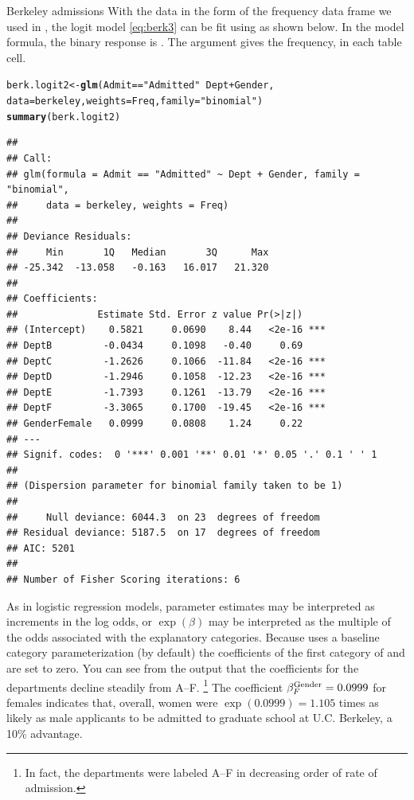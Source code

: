 \documentclass[11pt]{book}\usepackage[]{graphicx}\usepackage[]{color}
\makeatletter
\newcommand{\hlstr}[1]{\textcolor[rgb]{0.192,0.494,0.8}{#1}}%
\newcommand{\hlopt}[1]{\textcolor[rgb]{0,0,0}{#1}}%
\newcommand{\hlstd}[1]{\textcolor[rgb]{0.345,0.345,0.345}{#1}}%
\newcommand{\hlkwb}[1]{\textcolor[rgb]{0.69,0.353,0.396}{#1}}%
\newcommand{\hlkwc}[1]{\textcolor[rgb]{0.333,0.667,0.333}{#1}}%
\newcommand{\hlkwd}[1]{\textcolor[rgb]{0.737,0.353,0.396}{\textbf{#1}}}%
\newenvironment{kframe}{%
 \def\at@end@of@kframe{}%
 \ifinner\ifhmode%
  \def\at@end@of@kframe{\end{minipage}}%
  \begin{minipage}{\columnwidth}%
 \fi\fi%
 \def\FrameCommand##1{\hskip\@totalleftmargin \hskip-\fboxsep
 \colorbox{shadecolor}{##1}\hskip-\fboxsep
     \hskip-\linewidth \hskip-\@totalleftmargin \hskip\columnwidth}%
 \MakeFramed {\advance\hsize-\width
   \@totalleftmargin\z@ \linewidth\hsize
   \@setminipage}}%
 {\par\unskip\endMakeFramed%
 \at@end@of@kframe}
\newenvironment{knitrout}{}{} %
\renewenvironment{knitrout}{\small\renewcommand{\baselinestretch}{.85}}{} %
\makeatother
\begin{document}
\begin{Example}[berkeley7]{Berkeley admissions}
With the data in the form of the frequency data frame 
we used in , the logit model \eqref{eq:berk3}
can be fit using  as shown below.  In the model formula,
the binary response is . The 
argument gives the frequency,  in each table cell.

\begin{knitrout}
\color{fgcolor}\begin{kframe}
\begin{alltt}
\hlstd{berk.logit2} \hlkwb{<-} \hlkwd{glm}\hlstd{(Admit}\hlopt{==}\hlstr{"Admitted"} \hlopt{~} \hlstd{Dept} \hlopt{+} \hlstd{Gender,}
                   \hlkwc{data}\hlstd{=berkeley,} \hlkwc{weights}\hlstd{=Freq,} \hlkwc{family}\hlstd{=}\hlstr{"binomial"}\hlstd{)}
\hlkwd{summary}\hlstd{(berk.logit2)}
\end{alltt}
\begin{verbatim}
## 
## Call:
## glm(formula = Admit == "Admitted" ~ Dept + Gender, family = "binomial", 
##     data = berkeley, weights = Freq)
## 
## Deviance Residuals: 
##     Min       1Q   Median       3Q      Max  
## -25.342  -13.058   -0.163   16.017   21.320  
## 
## Coefficients:
##              Estimate Std. Error z value Pr(>|z|)    
## (Intercept)    0.5821     0.0690    8.44   <2e-16 ***
## DeptB         -0.0434     0.1098   -0.40     0.69    
## DeptC         -1.2626     0.1066  -11.84   <2e-16 ***
## DeptD         -1.2946     0.1058  -12.23   <2e-16 ***
## DeptE         -1.7393     0.1261  -13.79   <2e-16 ***
## DeptF         -3.3065     0.1700  -19.45   <2e-16 ***
## GenderFemale   0.0999     0.0808    1.24     0.22    
## ---
## Signif. codes:  0 '***' 0.001 '**' 0.01 '*' 0.05 '.' 0.1 ' ' 1
## 
## (Dispersion parameter for binomial family taken to be 1)
## 
##     Null deviance: 6044.3  on 23  degrees of freedom
## Residual deviance: 5187.5  on 17  degrees of freedom
## AIC: 5201
## 
## Number of Fisher Scoring iterations: 6
\end{verbatim}
\end{kframe}
\end{knitrout}

As in logistic regression models, parameter estimates may be interpreted
as increments in the log odds, or $\exp(\beta)$ may be interpreted
as the multiple of the odds associated with the explanatory categories.
Because  uses a baseline category parameterization (by default)
the coefficients of the first category of  and
 are set to zero.
You can see from the  output
that the coefficients for the departments decline steadily
from A--F.%
\footnote{
In fact, the departments were labeled A--F in decreasing order of
rate of admission.
}
The coefficient $\beta _F^{\mbox{\scriptsize Gender}} = 0.0999$
for females indicates that, overall, women were $\exp({0.0999}) = 1.105$
times as likely as male applicants to be admitted to graduate school
at U.C. Berkeley, a 10\% advantage.


\end{Example}
\end{document}
